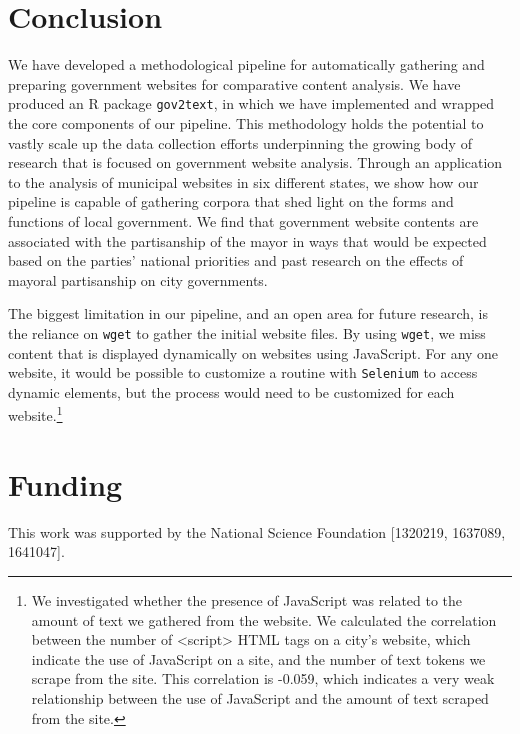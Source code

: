 \documentclass[11pt]{article}
\begin{document}
\section{Conclusion}


We have developed a methodological pipeline for automatically gathering and preparing government websites for comparative content analysis. We have produced an R package \texttt{gov2text}, in which we have implemented and wrapped the core components of our pipeline. This methodology holds the potential to vastly scale up the data collection efforts underpinning the growing body of research that is focused on government website analysis. Through an application to the analysis of municipal websites in six different states, we show how our pipeline is capable of gathering corpora that shed light on the forms and functions of local government. We find that government website contents are associated with the partisanship of the mayor in ways that would be expected based on the parties' national priorities and past research on the effects of mayoral partisanship on city governments.

The biggest limitation in our pipeline, and an open area for future research, is the reliance on \texttt{wget} to gather the initial website files. By using \texttt{wget}, we miss content that is displayed dynamically on websites using JavaScript. For any one website, it would be possible to customize a routine with \texttt{Selenium} to access dynamic elements, but the process would need to be customized for each website.\footnote{ We investigated whether the presence of JavaScript was related to the amount of text we gathered from the website. We calculated the correlation between the number of <script> HTML tags on a city's website, which indicate the use of JavaScript on a site, and the number of text tokens we scrape from the site. This correlation is -0.059, which indicates a very weak relationship between the use of JavaScript and the amount of text scraped from the site.}


\section*{Funding}
This work was supported by the National Science Foundation [1320219, 1637089, 1641047].

%
%

%

\end{document}
